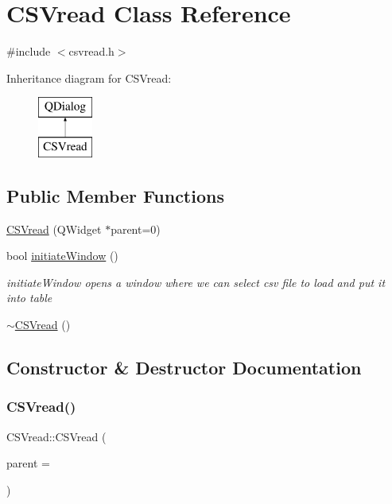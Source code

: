 \hypertarget{class_c_s_vread}{}\section{C\+S\+Vread Class Reference}
\label{class_c_s_vread}


{\ttfamily \#include $<$csvread.\+h$>$}

Inheritance diagram for C\+S\+Vread\+:\begin{figure}[H]
\begin{center}
\leavevmode
\includegraphics[height=2.000000cm]{class_c_s_vread}
\end{center}
\end{figure}
\subsection*{Public Member Functions}
\begin{DoxyCompactItemize}
\item 
\hyperlink{class_c_s_vread_a9677b85132c543c5a7eb4a2e4a3c95a0}{C\+S\+Vread} (Q\+Widget $\ast$parent=0)
\item 
bool \hyperlink{class_c_s_vread_a919b38bb6b737c7c9cbe5048e6e4b472}{initiate\+Window} ()
\begin{DoxyCompactList}\small\item\em initiate\+Window opens a window where we can select csv file to load and put it into table \end{DoxyCompactList}\item 
\hyperlink{class_c_s_vread_a8cac0f7ebeaed0c74581791229ab9b25}{$\sim$\+C\+S\+Vread} ()
\end{DoxyCompactItemize}


\subsection{Constructor \& Destructor Documentation}
\mbox{\label{class_c_s_vread_a9677b85132c543c5a7eb4a2e4a3c95a0}} 
\subsubsection{\texorpdfstring{C\+S\+Vread()}{CSVread()}}
{\footnotesize\ttfamily C\+S\+Vread\+::\+C\+S\+Vread (\begin{DoxyParamCaption}\item[{Q\+Widget $\ast$}]{parent = {} }\end{DoxyParamCaption})\hspace{0.3cm}{\ttfamily [explicit]}}


